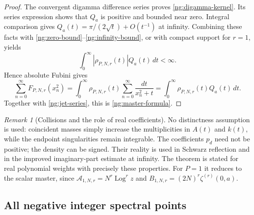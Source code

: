 \documentclass[11pt,letterpaper]{article}
\numberwithin{equation}{section}
\theoremstyle{definition}
\theoremstyle{remark}
\newtheorem{remark}[theorem]{Remark}
\DeclareMathOperator{\Log}{Log}
\begin{document}
\begin{proof}
The convergent digamma difference series proves
\eqref{ng:digamma-kernel}.  Its series expression shows that
$Q_a$ is positive and bounded near zero.  Integral comparison
gives $Q_a(t)=\pi/(2\sqrt t)+O(t^{-1})$ at infinity.
Combining these facts with
\eqref{ng:zero-bound}--\eqref{ng:infinity-bound}, or with compact
support for $r=1$, yields
\[
 \int_0^{\infty}|\rho_{P,N,r}(t)|Q_a(t)\,dt<\infty.
\]
Hence absolute Fubini gives
\[
 \sum_{n=0}^{\infty}F_{P,N,r}(x_n^2)
  =\int_0^{\infty}\rho_{P,N,r}(t)
                        \sum_{n=0}^{\infty}\frac{dt}{x_n^2+t}
  =\int_0^{\infty}\rho_{P,N,r}(t)Q_a(t)\,dt.
\]
Together with \eqref{ng:jet-series}, this is
\eqref{ng:master-formula}.
\end{proof}

\begin{remark}[Collisions and the role of real coefficients]
\label{ng:collisions}
No distinctness assumption is used: coincident masses simply
increase the multiplicities in $A(t)$ and $k(t)$, while the
endpoint singularities remain integrable.  The coefficients
$p_d$ need not be positive; the density can be signed.
Their reality is used in Schwarz reflection and in the improved
imaginary-part estimate at infinity.  The theorem is stated for
real polynomial weights with precisely these properties.
For $P=1$ it reduces to the scalar master, since
$\mathcal A_{1,N,r}=N^r\Log^r z$ and
$B_{1,N,r}=(2N)^r\zeta^{(r)}(0,a)$.
\end{remark}


\subsection{All negative integer spectral points}
\label{ng:negative-subsection}
\end{document}
